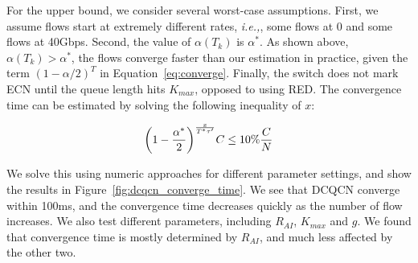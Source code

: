 For the upper bound, we consider several worst-case assumptions. First, we assume flows start
at extremely different rates, {\em i.e.,}, some flows at 0 and some flows at 40Gbps. Second, the value of 
$\alpha ({T_k})$ is $\alpha ^*$. As shown above, $\alpha ({T_k}) > \alpha ^*$, the flows 
converge faster than our estimation in practice, given the term $(1 - \alpha /2)^T$ in Equation~\ref{eq:converge}.
Finally, the switch does not mark ECN until the queue length hits $K_{max}$, opposed to
using RED. The convergence time can be estimated by solving the following inequality of $x$: 

\begin{equation}
\small
{\left( {1 - \frac{{{\alpha ^*}}}{2}} \right)^{\frac{x}{{{T^*}\tau '}}}}C \le 10\% \frac{C}{N}
\end{equation}

We solve this using numeric approaches for different parameter settings, and show the results
in Figure~\ref{fig:dcqcn_converge_time}. We see that DCQCN converge within 100ms, and the convergence
time decreases quickly as the number of flow increases. We also test different parameters, 
including $R_{AI}$, $K_{max}$ and $g$. We found that convergence time is mostly determined by
$R_{AI}$, and much less affected by the other two. 
